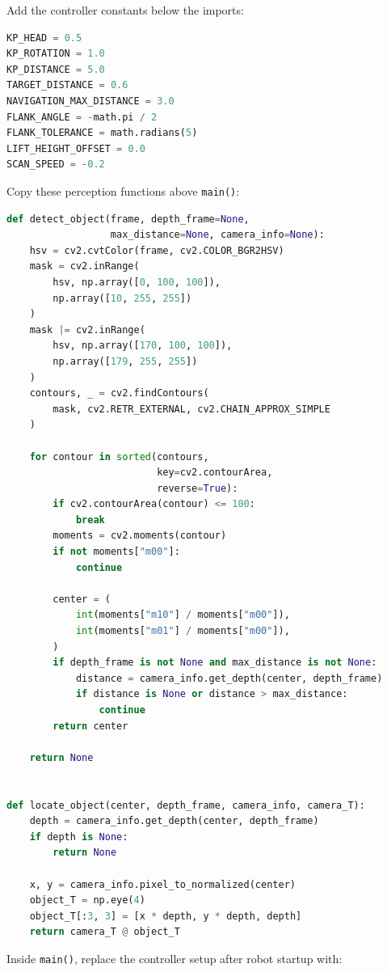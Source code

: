 \documentclass[11pt,a4paper]{article}
\begin{document}
Add the controller constants below the imports:

\begin{lstlisting}[language=Python]
KP_HEAD = 0.5
KP_ROTATION = 1.0
KP_DISTANCE = 5.0
TARGET_DISTANCE = 0.6
NAVIGATION_MAX_DISTANCE = 3.0
FLANK_ANGLE = -math.pi / 2
FLANK_TOLERANCE = math.radians(5)
LIFT_HEIGHT_OFFSET = 0.0
SCAN_SPEED = -0.2
\end{lstlisting}

Copy these perception functions above \texttt{main()}:

\begin{lstlisting}[language=Python]
def detect_object(frame, depth_frame=None,
                  max_distance=None, camera_info=None):
    hsv = cv2.cvtColor(frame, cv2.COLOR_BGR2HSV)
    mask = cv2.inRange(
        hsv, np.array([0, 100, 100]),
        np.array([10, 255, 255])
    )
    mask |= cv2.inRange(
        hsv, np.array([170, 100, 100]),
        np.array([179, 255, 255])
    )
    contours, _ = cv2.findContours(
        mask, cv2.RETR_EXTERNAL, cv2.CHAIN_APPROX_SIMPLE
    )

    for contour in sorted(contours,
                          key=cv2.contourArea,
                          reverse=True):
        if cv2.contourArea(contour) <= 100:
            break
        moments = cv2.moments(contour)
        if not moments["m00"]:
            continue

        center = (
            int(moments["m10"] / moments["m00"]),
            int(moments["m01"] / moments["m00"]),
        )
        if depth_frame is not None and max_distance is not None:
            distance = camera_info.get_depth(center, depth_frame)
            if distance is None or distance > max_distance:
                continue
        return center

    return None


def locate_object(center, depth_frame, camera_info, camera_T):
    depth = camera_info.get_depth(center, depth_frame)
    if depth is None:
        return None

    x, y = camera_info.pixel_to_normalized(center)
    object_T = np.eye(4)
    object_T[:3, 3] = [x * depth, y * depth, depth]
    return camera_T @ object_T
\end{lstlisting}

Inside \texttt{main()}, replace the controller setup after robot startup with:
\end{document}
